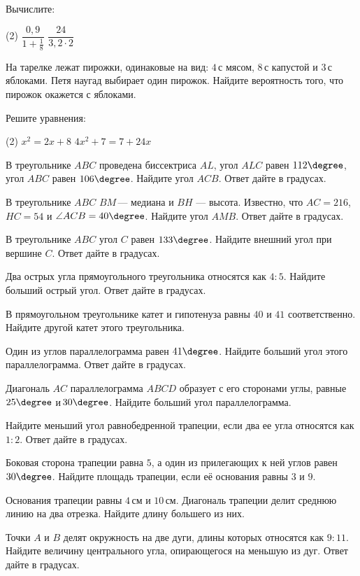 \begin{homework}[number=4]
	\begin{listofex}
		\item Вычислите: 
		\begin{tasks}(2)
			\task \( \dfrac{0,9}{1+\frac{1}{8}}\)
			\task \( \dfrac{24}{3,2\cdot2} \)
		\end{tasks}
		\item На тарелке лежат пирожки, одинаковые на вид: \( 4 \) с мясом, \( 8 \) с капустой и \( 3 \) с яблоками. Петя наугад выбирает один пирожок. Найдите вероятность того, что пирожок окажется с яблоками.
		\item Решите уравнения:
		\begin{tasks}(2)
			\task \( x^2=2x+8 \)
			\task \( 4x^2+7=7+24x \)
		\end{tasks}
		\item В треугольнике \( ABC \) проведена биссектриса \( AL \), угол \( ALC \) равен \( 112\degree \), угол \( ABC \) равен \( 106\degree \). Найдите угол \( ACB \). Ответ дайте в градусах.
		\item В треугольнике \( ABC \) \( BM \) --- медиана и \( BH \) --- высота. Известно, что \( AC=216 \), \( HC=54 \) и \( \angle ACB=40\degree \). Найдите угол \( AMB \). Ответ дайте в градусах.
		\item В треугольнике \( ABC \) угол \( C \) равен \( 133\degree \). Найдите внешний угол при вершине \( C \). Ответ дайте в градусах.
		\item Два острых угла прямоугольного треугольника относятся как \( 4:5 \). Найдите больший острый угол. Ответ дайте в градусах.
		\item В прямоугольном треугольнике катет и гипотенуза равны \( 40 \) и \( 41 \) соответственно. Найдите другой катет этого треугольника.
		\item Один из углов параллелограмма равен \( 41\degree \). Найдите больший угол этого параллелограмма. Ответ дайте в градусах.
		\item Диагональ \( AC \) параллелограмма \( ABCD \) образует с его сторонами углы, равные \( 25\degree \) и \( 30\degree \). Найдите больший угол параллелограмма.
		\item Найдите меньший угол равнобедренной трапеции, если два ее угла относятся как \( 1:2 \). Ответ дайте в градусах.
		\item Боковая сторона трапеции равна \( 5 \), а один из прилегающих к ней углов равен \( 30\degree \). Найдите площадь трапеции, если её основания равны \( 3 \) и \( 9 \).
		\item Основания трапеции равны \( 4 \) см и \( 10 \) см. Диагональ трапеции делит среднюю линию на два отрезка. Найдите длину большего из них.
		\item Точки \( A \) и \( B \) делят окружность на две дуги, длины которых относятся как \( 9:11 \). Найдите величину центрального угла, опирающегося на меньшую из дуг. Ответ дайте в градусах.
	\end{listofex}
\end{homework}
